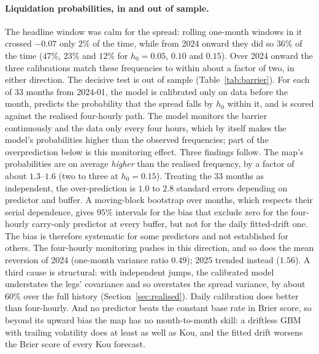 \documentclass[11pt]{article}
\theoremstyle{plain}
\theoremstyle{definition}
\theoremstyle{remark}
\begin{document}
\paragraph{Liquidation probabilities, in and out of sample.} The headline window was calm for the
spread: rolling one-month windows in it crossed $-0.07$ only $2\%$ of the time, while from 2024
onward they did so $36\%$ of the time ($47\%$, $23\%$ and $12\%$ for $h_0=0.05$, $0.10$ and
$0.15$). Over 2024 onward the three calibrations match these frequencies to within about a
factor of two, in either direction. The decisive test is out of sample (Table~\ref{tab:barrier}). For each of $33$ months
from 2024-01, the model is calibrated only on data before the month, predicts the probability that
the spread falls by $h_0$ within it, and is scored against the realised four-hourly path. The model
monitors the barrier continuously and the data only every four hours, which by itself makes the
model's probabilities higher than the observed frequencies; part of the overprediction below is
this monitoring effect. Three findings follow. The map's probabilities are on average
\emph{higher} than the realised frequency, by a factor of about $1.3$--$1.6$ (two to three at
$h_0=0.15$). Treating the $33$ months as independent, the over-prediction is $1.0$ to $2.8$ standard errors
depending on predictor and buffer. A moving-block bootstrap over months, which respects their serial
dependence, gives $95\%$ intervals for the bias that exclude zero for the four-hourly carry-only
predictor at every buffer, but not for the daily fitted-drift one. The bias is therefore systematic
for some predictors and not established for others. The four-hourly monitoring pushes in this
direction, and so does the mean reversion of 2024 (one-month variance ratio $0.49$); 2025 trended
instead ($1.56$). A third cause is structural: with independent jumps, the calibrated model understates
the legs' covariance and so overstates the spread variance, by about $60\%$ over the full history
(Section~\ref{sec:realised}).
Daily calibration does better than four-hourly. And no predictor beats the constant base rate in
Brier score, so beyond its upward bias the map has no month-to-month skill: a driftless GBM with
trailing volatility does at least as well as Kou, and the fitted drift worsens the Brier score of
every Kou forecast.
\end{document}
